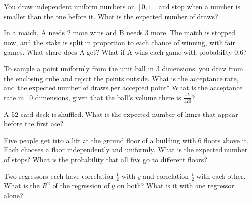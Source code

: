 
\begin{question}\label{iq:iv1:timed-test-8:7}
You draw independent uniform numbers on $[0, 1]$ and stop when a number is smaller than the one before it. What is the expected number of draws?
\end{question}

\begin{question}\label{iq:iv1:timed-test-8:8}
In a match, A needs 2 more wins and B needs 3 more. The match is stopped now, and the stake is split in proportion to each chance of winning, with fair games. What share does A get? What if A wins each game with probability $0.6$?
\end{question}

\begin{question}\label{iq:iv1:timed-test-8:9}
To sample a point uniformly from the unit ball in 3 dimensions, you draw from the enclosing cube and reject the points outside. What is the acceptance rate, and the expected number of draws per accepted point? What is the acceptance rate in 10 dimensions, given that the ball's volume there is $\frac{\pi^5}{120}$?
\end{question}

\begin{question}\label{iq:iv1:timed-test-8:10}
A 52-card deck is shuffled. What is the expected number of kings that appear before the first ace?
\end{question}

\begin{question}\label{iq:iv1:timed-test-8:11}
Five people get into a lift at the ground floor of a building with 6 floors above it. Each chooses a floor independently and uniformly. What is the expected number of stops? What is the probability that all five go to different floors?
\end{question}

\begin{question}\label{iq:iv1:timed-test-8:12}
Two regressors each have correlation $\frac12$ with $y$ and correlation $\frac12$ with each other. What is the $R^2$ of the regression of $y$ on both? What is it with one regressor alone?
\end{question}
